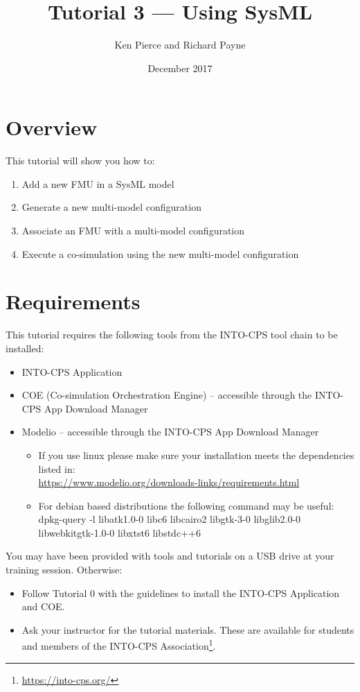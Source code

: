 \documentclass[11pt,a4paper]{../tutorial}
\title{Tutorial 3 --- Using SysML}
\date{December 2017}
\author{Ken Pierce and Richard Payne}
\begin{document}
\section*{Overview}

This tutorial will show you how to:

\begin{enumerate}[noitemsep]
\item Add a new FMU in a SysML model
\item Generate a new multi-model configuration
\item Associate an FMU with a multi-model configuration
\item Execute a co-simulation using the new multi-model configuration
\end{enumerate}

\section*{Requirements}

This tutorial requires the following tools from the INTO-CPS tool chain to be installed:

\begin{itemize}[noitemsep]
\item INTO-CPS Application
\item COE (Co-simulation Orchestration Engine) -- accessible through the INTO-CPS App Download Manager
\item Modelio -- accessible through the INTO-CPS App Download Manager
	\begin{small}
	\begin{itemize}
		\item If you use linux please make sure your installation meets the dependencies listed in:\\ \url{https://www.modelio.org/downloads-links/requirements.html}
		\item For debian based distributions the following command may be useful:\\
		dpkg-query -l  libatk1.0-0 libc6 libcairo2 libgtk-3-0 libglib2.0-0 libwebkitgtk-1.0-0 libxtst6 libstdc++6
	\end{itemize}
	\end{small}
\end{itemize}

You may have been provided with tools and tutorials on a USB drive at your training session. Otherwise: 
\begin{itemize}[noitemsep]
\item Follow Tutorial 0 with the guidelines to install the INTO-CPS Application and COE.
\item Ask your instructor for the tutorial materials. These are available for students and members of the INTO-CPS Association\footnote{\url{https://into-cps.org/}}.
\end{itemize}
\end{document}
